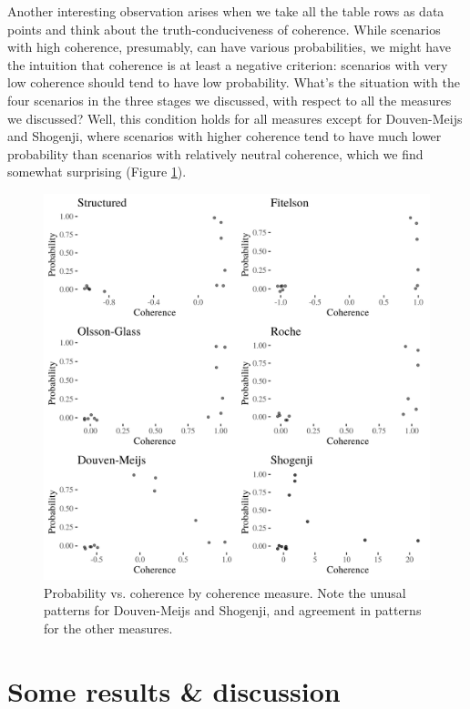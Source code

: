 \documentclass[10pt,]{scrartcl}
\begin{document}
Another interesting observation arises when we take all the table rows as data points and think about the truth-conduciveness of coherence. While scenarios with high coherence, presumably, can have various probabilities, we might have the intuition that coherence is at least a negative criterion: scenarios with very low coherence should tend to have low probability. What's the situation with the four scenarios in the three stages we discussed, with respect to all the measures we discussed? Well, this condition holds for all measures except for Douven-Meijs and Shogenji, where scenarios with higher coherence tend to have much lower probability than scenarios with relatively neutral coherence, which we find somewhat surprising (Figure \ref{fig:cohplot}).



\begin{figure}
    \includegraphics{cohPlots.png}
    \caption{Probability vs. coherence by coherence measure. Note the unusal patterns for Douven-Meijs and Shogenji, and agreement in patterns for the other measures.}
    \label{fig:cohplot}
\end{figure}





\section{Some results \& discussion}\label{sec:discussion}
\end{document}
